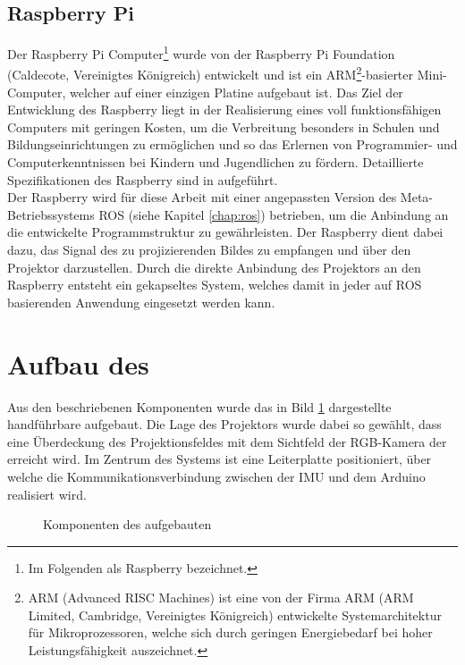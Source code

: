 \subsection{Raspberry Pi\textsuperscript{\texttrademark}}
Der Raspberry Pi\textsuperscript{\texttrademark} Computer\footnote{Im Folgenden als Raspberry bezeichnet.} wurde von der Raspberry Pi Foundation (Caldecote, Vereinigtes Königreich) entwickelt und ist ein ARM\footnote{ARM (Advanced RISC Machines) ist eine von der Firma ARM (ARM Limited, Cambridge, Vereinigtes Königreich) entwickelte Systemarchitektur für Mikroprozessoren, welche sich durch geringen Energiebedarf bei hoher Leistungsfähigkeit auszeichnet.}-basierter Mini-Computer, welcher auf einer einzigen Platine aufgebaut ist. Das Ziel der Entwicklung des Raspberry liegt in der Realisierung eines voll funktionsfähigen Computers mit geringen Kosten, um die Verbreitung besonders in Schulen und Bildungseinrichtungen zu ermöglichen und so das Erlernen von Programmier- und Computerkenntnissen bei Kindern und Jugendlichen zu fördern. Detaillierte Spezifikationen des Raspberry sind in  aufgeführt.\\

Der Raspberry wird für diese Arbeit mit einer angepassten Version des Meta-Betriebssystems ROS (siehe Kapitel \ref{chap:ros}) betrieben, um die Anbindung an die entwickelte Programmstruktur zu gewährleisten. Der Raspberry dient dabei dazu, das Signal des zu projizierenden Bildes zu empfangen und über den Projektor darzustellen. Durch die direkte Anbindung des Projektors an den Raspberry entsteht ein gekapseltes System, welches damit in jeder auf ROS basierenden Anwendung eingesetzt werden kann.


\section{Aufbau des }
Aus den beschriebenen Komponenten wurde das in Bild \ref{fig.kinpro} dargestellte handführbare \kps{} aufgebaut. Die Lage des Projektors wurde dabei so gewählt, dass eine Überdeckung des Projektionsfeldes mit dem Sichtfeld der RGB-Kamera der \kin erreicht wird. Im Zentrum des Systems ist eine Leiterplatte positioniert, über welche die Kommunikationsverbindung zwischen der IMU und dem Arduino realisiert wird.\\

\begin{figure}[ht]
	\begin{center}%
		\caption{Komponenten des aufgebauten }
		\label{fig.kinpro}
	\end{center}
\end{figure}

